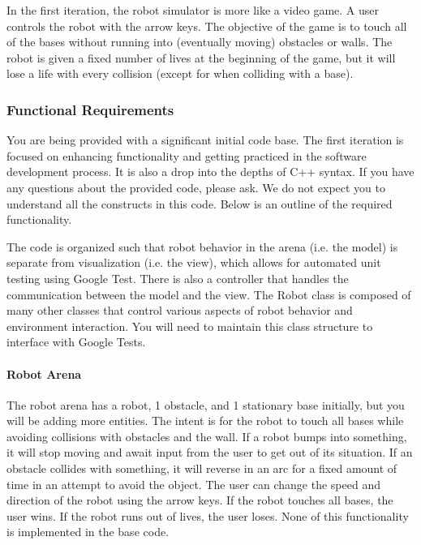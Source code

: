 In the first iteration, the robot simulator is more like a video game. A user controls the robot with the arrow keys. The objective of the game is to touch all of the bases without running into (eventually moving) obstacles or walls. The robot is given a fixed number of lives at the beginning of the game, but it will lose a life with every collision (except for when colliding with a base).

\subsubsection*{Functional Requirements}

You are being provided with a significant initial code base. The first iteration is focused on enhancing functionality and getting practiced in the software development process. It is also a drop into the depths of C++ syntax. If you have any questions about the provided code, please ask. We do not expect you to understand all the constructs in this code. Below is an outline of the required functionality.

The code is organized such that robot behavior in the arena (i.\+e. the model) is separate from visualization (i.\+e. the view), which allows for automated unit testing using Google Test. There is also a controller that handles the communication between the model and the view. The Robot class is composed of many other classes that control various aspects of robot behavior and environment interaction. You will need to maintain this class structure to interface with Google Tests.

\paragraph*{Robot Arena}

The robot arena has a robot, 1 obstacle, and 1 stationary base initially, but you will be adding more entities. The intent is for the robot to touch all bases while avoiding collisions with obstacles and the wall. If a robot bumps into something, it will stop moving and await input from the user to get out of its situation. If an obstacle collides with something, it will reverse in an arc for a fixed amount of time in an attempt to avoid the object. The user can change the speed and direction of the robot using the arrow keys. If the robot touches all bases, the user wins. If the robot runs out of lives, the user loses. None of this functionality is implemented in the base code.

